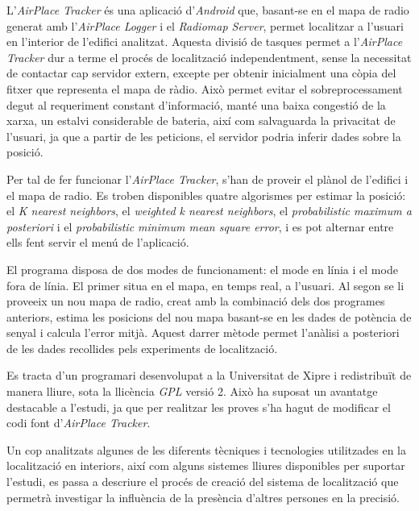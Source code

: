 L'\textit{AirPlace Tracker} és una aplicació d'\textit{Android} que, basant-se en el mapa de radio generat amb l'\textit{AirPlace Logger} i el \textit{Radiomap Server}, permet localitzar a l'usuari en l'interior de l'edifici analitzat. Aquesta divisió de tasques permet a l'\textit{AirPlace Tracker} dur a terme el procés de localització independentment, sense la necessitat de contactar cap servidor extern, excepte per obtenir inicialment una còpia del fitxer que representa el mapa de ràdio. Això permet evitar el sobreprocessament degut al requeriment constant d'informació, manté una baixa congestió de la xarxa, un estalvi considerable de bateria, així com salvaguarda la privacitat de l'usuari, ja que a partir de les peticions, el servidor podria inferir dades sobre la posició.

Per tal de fer funcionar l'\textit{AirPlace Tracker}, s'han de proveir el plànol de l'edifici i el mapa de radio. Es troben disponibles quatre algorismes per estimar la posició: el \textit{K nearest neighbors}, el \textit{weighted k nearest neighbors}, el \textit{probabilistic maximum a posteriori} i el \textit{probabilistic minimum mean square error}, i es pot alternar entre ells fent servir el menú de l'aplicació.

El programa disposa de dos modes de funcionament: el mode en línia i el mode fora de línia. El primer situa en el mapa, en temps real, a l'usuari. Al segon se li proveeix un nou mapa de radio, creat amb la combinació dels dos programes anteriors, estima les posicions del nou mapa basant-se en les dades de potència de senyal i calcula l'error mitjà. Aquest darrer mètode permet l'anàlisi a posteriori de les dades recollides pels experiments de localització.

Es tracta d'un programari desenvolupat a la Universitat de Xipre i redistribuït de manera lliure, sota la llicència \textit{GPL} versió 2. Això ha suposat un avantatge destacable a l'estudi, ja que per realitzar les proves s'ha hagut de modificar el codi font d'\textit{AirPlace Tracker}.

Un cop analitzats algunes de les diferents tècniques i tecnologies utilitzades en la localització en interiors, així com alguns sistemes lliures disponibles per suportar l'estudi, es passa a descriure el procés de creació del sistema de localització que permetrà investigar la influència de la presència d'altres persones en la precisió.


